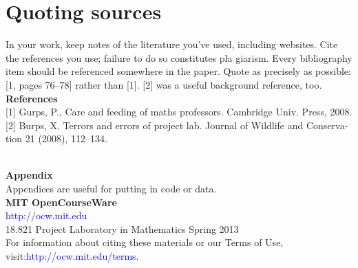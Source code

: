 \documentclass{article}
\begin{document}
\section{Quoting sources}
In your work, keep notes of the literature you’ve used, including
websites. Cite the references you use; failure to do so constitutes pla­
giarism. Every bibliography item should be referenced somewhere in
the paper. Quote as precisely as possible: [1, pages 76–78] rather than
[1]. [2] was a useful background reference, too.
	\\ \vspace{3mm}
      \textbf{References}
      \\ \vspace{3mm}
      [1] Gurps, P., Care and feeding of maths professors. Cambridge Univ. Press, 2008.
      [2] Burps, X. Terrors and errors of project lab. Journal of Wildlife and Conserva­
      tion 21 (2008), 112–134.

	\\ \vspace{3mm}
	\textbf{Appendix}
	\\ \vspace{3mm}
	Appendices are useful for putting in code or data.
	\\ \vspace{1cm}
	\textbf{MIT OpenCourseWare}\\
	\textcolor{blue}{http://ocw.mit.edu} 
	\\
	18.821 Project Laboratory in Mathematics
	Spring 2013
	\\ \vspace{2cm}
	For information about citing these materials or our Terms of Use, visit:\textcolor{blue}{http://ocw.mit.edu/terms.}
\end{document}

